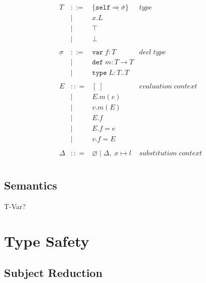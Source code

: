\documentclass{llncs}
\begin{document}
\[\begin{array}{lll}
\begin{array}{lllr}
T & ::= & \{\texttt{self} \Rightarrow \overline{\sigma}\} & type \\
& | & x.L &\\
& | & \top & \\
& | & \bot & \\
&&\\
\sigma & ::= & \texttt{var} \; f:T & decl \; type\\
       & |   & \texttt{def} \; m:T \rightarrow T \\
		 & |   & \texttt{type} \; L : T .. T &\\
&&\\
E & :: = & [\;] & evaluation \; context \\
       & | & E.m(e)\\
       & | & v.m(E)\\
       & | & E.f\\
       & | & E.f = e\\
       & | & v.f = E\\
&&\\
\Delta & :: = & \varnothing \; | \; \Delta,\; x \mapsto l & substitution \; context \\
\end{array}
\end{array}
\]

\subsection{Semantics}












T-Var? 

\section{Type Safety}

\subsection{Subject Reduction}
\end{document}
